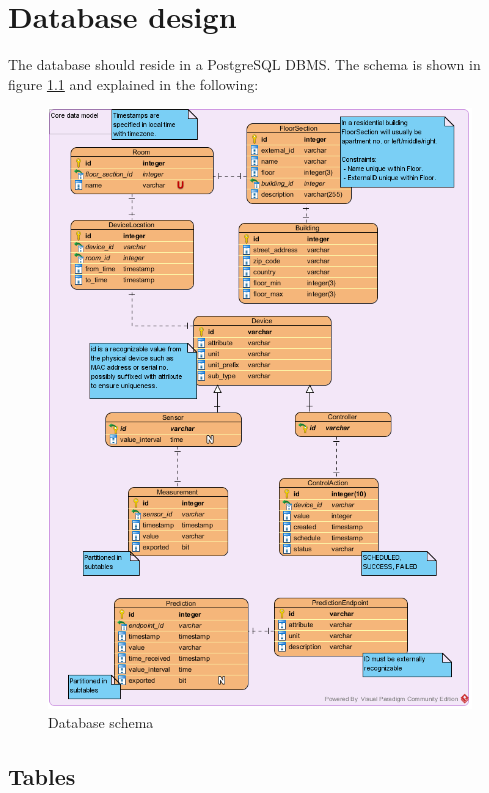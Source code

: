 
\chapter{Database design}\label{ch:db_design}

The database should reside in a PostgreSQL DBMS. The schema is shown in figure \ref{figureDbCoreModel} and explained in the following:

\begin{figure}[H]
    \centering
    \includegraphics[width=\textwidth]{figures/db_core_schema}
    \caption{Database schema}
    \label{figureDbCoreModel}
\end{figure}

\section{Tables}

